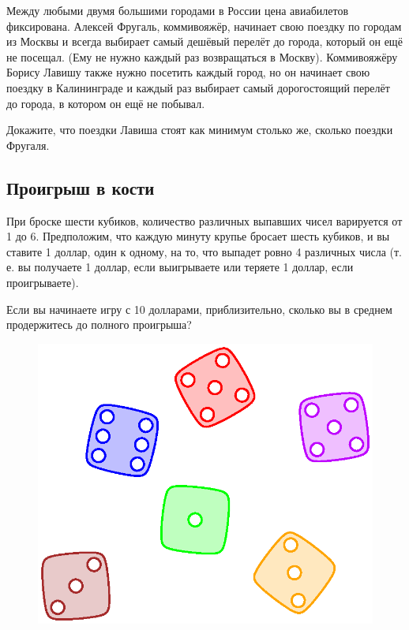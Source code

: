 Между любыми двумя большими городами в России цена авиабилетов фиксирована.
Алексей Фругаль, коммивояжёр, начинает свою поездку по городам из Москвы и всегда выбирает самый дешёвый перелёт до города, который он ещё не посещал.
(Ему не нужно каждый раз возвращаться в Москву).
Коммивояжёру Борису Лавишу также нужно посетить каждый город, но он начинает свою поездку в Калининграде и каждый раз выбирает самый дорогостоящий перелёт до города, в котором он ещё не побывал.

Докажите, что поездки Лавиша стоят как минимум столько же, сколько поездки Фругаля. %

\subsection*{Проигрыш в кости}%

При броске шести кубиков, количество различных выпавших чисел варируется от 1 до 6.
Предположим, что каждую минуту крупье бросает шесть кубиков,
и вы ставите 1 доллар, один к одному, на то, что выпадет ровно 4 различных числа
(т. е. вы получаете 1 доллар, если выигрываете или теряете 1 доллар, если проигрываете).

Если вы начинаете игру с 10 долларами, приблизительно, сколько вы в среднем продержитесь до полного проигрыша?

\begin{figure}[h!]
\centering
\includegraphics[scale=0.5]{Figs/Combinatorics/throw}
\end{figure}
